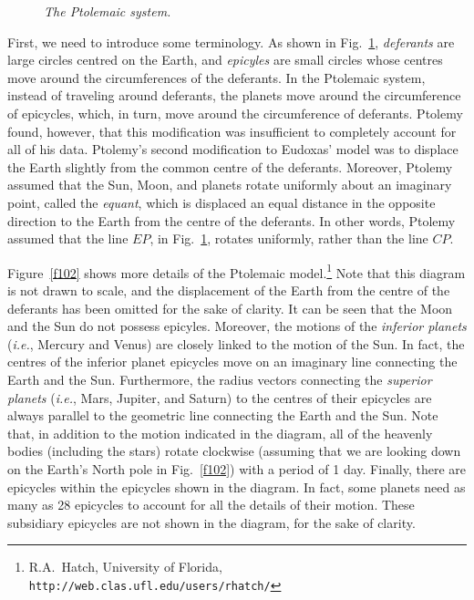 \begin{figure}
\epsfysize=3in
\centerline{}
\caption{\em The Ptolemaic system.}\label{f101}  
\end{figure}

First, we need to introduce some terminology.
As shown in Fig.~\ref{f101},
{\em deferants} are large circles centred on the Earth, and {\em epicyles} are small circles whose
centres move around the circumferences of the deferants. In the  Ptolemaic system,
instead of traveling around deferants,
the planets 
move around the circumference of epicycles, which, in turn, move around the circumference of
 deferants. Ptolemy found, however, that this modification was insufficient to completely account
 for
all of his data. Ptolemy's second modification to Eudoxas' model was to displace the Earth slightly from the
common centre of  the deferants. Moreover, Ptolemy assumed that the Sun, Moon, and planets rotate
uniformly about an imaginary point, called the {\em equant}, which is displaced an equal distance in the opposite
direction to the Earth from the centre of the deferants. In other words, Ptolemy assumed that the line
 $EP$, in Fig.~\ref{f101},
rotates uniformly, rather than the line $CP$.

Figure~\ref{f102} shows more details of the Ptolemaic model.\footnote{R.A.~Hatch, University
of Florida, {\tt http://web.clas.ufl.edu/users/rhatch/}}  Note that this diagram is
not drawn to scale, and the displacement of the Earth from the centre of the deferants has been
omitted for the sake of clarity. It can be seen that the Moon and the Sun do not possess
epicyles. 
Moreover, the motions of the {\em inferior planets} ({\em i.e.},
Mercury and Venus) are closely linked to the motion of the Sun. In fact, the centres of the inferior planet
epicycles move on an imaginary line connecting the Earth and the Sun. Furthermore, the
radius vectors connecting the {\em superior planets} ({\em i.e.}, Mars, Jupiter, and Saturn)
to the centres of their epicycles are always parallel to the geometric line connecting the
Earth and the Sun. Note that, in addition to the motion indicated in the diagram, all of the
heavenly bodies (including the stars) rotate clockwise (assuming that we are looking down on the
Earth's North pole in Fig.~\ref{f102}) with a period of 1 day. Finally, there are epicycles
within the epicycles shown in the diagram. In fact, some planets need as many as 28
epicycles to account for all the details of their motion. These subsidiary epicycles
are not shown in the diagram, for the sake of clarity.

